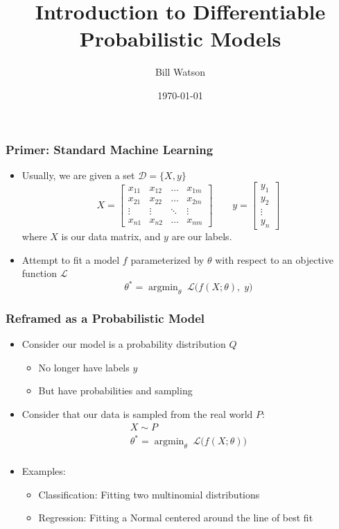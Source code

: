 \documentclass{beamer}
\title{Introduction to Differentiable Probabilistic Models}
\author{Bill Watson}
\institute{S\&P Global}
\date{\today}
\DeclareMathOperator*{\argmin}{argmin}
\begin{document}
\begin{frame}
\titlepage
\end{frame}


\begin{frame}
\frametitle{Primer: Standard Machine Learning}
\begin{itemize}
\item Usually, we are given a set $\mathcal{D} = \{ X, y\}$
  \begin{equation*}
  X =
    \begin{bmatrix}
        x_{11} & x_{12} & \dots  & x_{1m} \\
        x_{21} & x_{22} & \dots  & x_{2m} \\
        \vdots & \vdots & \ddots & \vdots \\
        x_{n1} & x_{n2} & \dots  & x_{nm}
    \end{bmatrix}
    \quad \quad
    y =
    \begin{bmatrix}
      y_1 \\
      y_2 \\
      \vdots \\
      y_n
    \end{bmatrix}
  \end{equation*}
  where $X$ is our data matrix, and $y$ are our labels.
\pause
\item Attempt to fit a model $f$ parameterized by $\theta$ with respect to
an objective function $\mathcal{L}$
\begin{equation*}
  \theta^{*}  =  \argmin_{\theta} \; \mathcal{L} \big( f( X;\theta), \; y \big)
\end{equation*}
\end{itemize}
\end{frame}


\begin{frame}
\frametitle{Reframed as a Probabilistic Model}
\begin{itemize}
\item Consider our model is a probability distribution $Q$
\begin{itemize}
  \item No longer have labels $y$
  \item But have probabilities and sampling
\end{itemize}
\pause
\item Consider that our data is sampled from the real world $P$:
\begin{equation*}
  \begin{gathered}
  X \sim P \\
  \theta^{*} = \argmin_{\theta} \; \mathcal{L} \big( f(X;\theta) \big) \\
\end{gathered}
\end{equation*}
\pause
\item Examples:
\begin{itemize}
  \item Classification: Fitting two multinomial distributions
  \item Regression: Fitting a Normal centered around the line of best fit
\end{itemize}
\end{itemize}
\end{frame}
\end{document}
